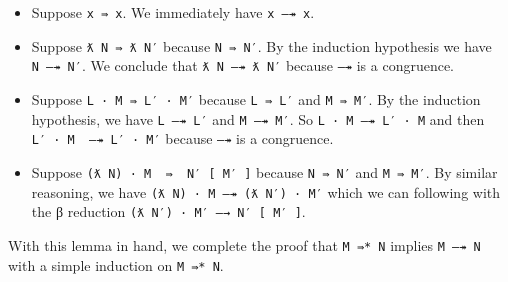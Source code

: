 \begin{itemize}
\item
  Suppose \texttt{x\ ⇛\ x}. We immediately have \texttt{x\ —↠\ x}.
\item
  Suppose \texttt{ƛ\ N\ ⇛\ ƛ\ N′} because \texttt{N\ ⇛\ N′}. By the
  induction hypothesis we have \texttt{N\ —↠\ N′}. We conclude that
  \texttt{ƛ\ N\ —↠\ ƛ\ N′} because \texttt{—↠} is a congruence.
\item
  Suppose \texttt{L\ ·\ M\ ⇛\ L′\ ·\ M′} because \texttt{L\ ⇛\ L′} and
  \texttt{M\ ⇛\ M′}. By the induction hypothesis, we have
  \texttt{L\ —↠\ L′} and \texttt{M\ —↠\ M′}. So
  \texttt{L\ ·\ M\ —↠\ L′\ ·\ M} and then
  \texttt{L′\ ·\ M\ \ —↠\ L′\ ·\ M′} because \texttt{—↠} is a
  congruence.
\item
  Suppose \texttt{(ƛ\ N)\ ·\ M\ \ ⇛\ \ N′\ {[}\ M′\ {]}} because
  \texttt{N\ ⇛\ N′} and \texttt{M\ ⇛\ M′}. By similar reasoning, we have
  \texttt{(ƛ\ N)\ ·\ M\ —↠\ (ƛ\ N′)\ ·\ M′} which we can following with
  the β reduction \texttt{(ƛ\ N′)\ ·\ M′\ —→\ N′\ {[}\ M′\ {]}}.
\end{itemize}

With this lemma in hand, we complete the proof that \texttt{M\ ⇛*\ N}
implies \texttt{M\ —↠\ N} with a simple induction on \texttt{M\ ⇛*\ N}.

\begin{fence}
\begin{code}%
\>[0]\AgdaSpace{}%
\AgdaSymbol{:}\AgdaSpace{}%
\AgdaSpace{}%
\AgdaSymbol{\}}\AgdaSpace{}%
\AgdaSymbol{\{}\AgdaSpace{}%
\AgdaSpace{}%
\AgdaSymbol{:}\AgdaSpace{}%
\AgdaSpace{}%
\AgdaSpace{}%
\AgdaSymbol{\}}\<%
\\
\>[0][@{}l@{\AgdaIndent{0}}]%
\>[2]%
\>[460I]\AgdaSpace{}%
\AgdaSpace{}%
\<%
\\
\>[.][@{}l@{}]\<[460I]%
\>[4]\AgdaComment{------}\<%
\\
%
\>[2]\AgdaSpace{}%
\AgdaSpace{}%
\AgdaSpace{}%
\<%
\\
\>[0]\AgdaSpace{}%
\AgdaSymbol{(}\AgdaSpace{}%
\AgdaSymbol{)}\AgdaSpace{}%
\AgdaSymbol{=}\AgdaSpace{}%
\AgdaSpace{}%
\<%
\\
\>[0]\AgdaSpace{}%
\AgdaSymbol{(}\AgdaSpace{}%
\AgdaSpace{}%
\AgdaSpace{}%
\AgdaSpace{}%
\AgdaSymbol{)}\AgdaSpace{}%
\AgdaSymbol{=}\AgdaSpace{}%
\AgdaSpace{}%
\AgdaSymbol{(}\AgdaSpace{}%
\AgdaSymbol{)}\AgdaSpace{}%
\AgdaSymbol{(}\AgdaSpace{}%
\AgdaSymbol{)}\<%
\end{code}
\end{fence}

